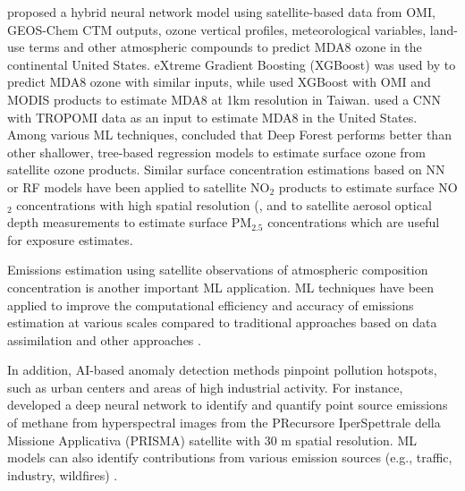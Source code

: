 \documentclass[gmd, manuscript]{copernicus}
\begin{document}
\citet{di_hybrid_2017} proposed a hybrid neural network model using satellite-based data from OMI, GEOS-Chem CTM outputs, ozone vertical profiles, meteorological variables, land-use terms and other atmospheric compounds to predict MDA8 ozone in the continental United States. eXtreme Gradient Boosting (XGBoost) was used by \citet{liu_spatiotemporal_2020} to predict MDA8 ozone with similar inputs, while \citet{jung_machine_2024} used XGBoost with OMI and MODIS products to estimate MDA8 at 1km resolution in Taiwan. \citet{ghahremanloo_deep_2023} used a CNN with TROPOMI data as an input to estimate MDA8 in the United States. Among various ML techniques, \citet{zong_deep_2024} concluded that Deep Forest performs better than other shallower, tree-based regression models to estimate surface ozone from satellite ozone products. Similar surface concentration estimations based on NN or RF models have been applied to satellite NO$_2$ products to estimate surface NO$_2$ concentrations with high spatial resolution (\citep{kim_importance_2021}, and to satellite aerosol optical depth measurements to estimate surface PM$_{2.5}$ concentrations \citep{huang_high-resolution_2021, xiao_evaluation_2021} which are useful for exposure estimates.

Emissions estimation using satellite observations of atmospheric composition concentration is another important ML application. ML techniques have been applied to improve the computational efficiency and accuracy of emissions estimation at various scales compared to traditional approaches based on data assimilation and other approaches \citep{dadheech_high-resolution_2024, xing_rapid_2022, tu_estimation_2023, li_emission-based_2024, bruno_u-plume_2024}. 

In addition, AI-based anomaly detection methods pinpoint pollution hotspots, such as urban centers and areas of high industrial activity. For instance, \citet{joyce_using_2023} developed a deep neural network to identify and quantify point source emissions of methane from hyperspectral images from the PRecursore IperSpettrale della Missione Applicativa (PRISMA) satellite with 30 m spatial resolution. ML models can also identify contributions from various emission sources (e.g., traffic, industry, wildfires) \citep{kang_mitigating_2024, finch_automated_2022, kurchaba_anomalous_2023, rollend_machine_2023}. 
\end{document}
